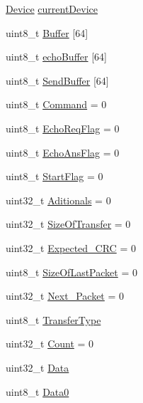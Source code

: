 \begin{DoxyCompactItemize}
\hyperlink{struct_device}{\-Device} \hyperlink{group___copter_control_b_l_ga6a2dbcb4687334b324d72b9824174903}{current\-Device}
\item 
uint8\-\_\-t \hyperlink{group___copter_control_b_l_ga4087ff5eba1dd1ed72c881f9c6ecc662}{\-Buffer} \mbox{[}64\mbox{]}
\item 
uint8\-\_\-t \hyperlink{group___copter_control_b_l_ga7dd4853474086e75f278ea07c2f0b506}{echo\-Buffer} \mbox{[}64\mbox{]}
\item 
uint8\-\_\-t \hyperlink{group___copter_control_b_l_ga8f7836468d53f1bf54ab28474ae14624}{\-Send\-Buffer} \mbox{[}64\mbox{]}
\item 
uint8\-\_\-t \hyperlink{group___copter_control_b_l_ga5d77325144370536cfb1275bb9812dd8}{\-Command} = 0
\item 
uint8\-\_\-t \hyperlink{group___copter_control_b_l_gaeda788a6eac8e2e01a62eb1f62627c8e}{\-Echo\-Req\-Flag} = 0
\item 
uint8\-\_\-t \hyperlink{group___copter_control_b_l_ga80f6f95b1bc0667183dbf26b5439a289}{\-Echo\-Ans\-Flag} = 0
\item 
uint8\-\_\-t \hyperlink{group___copter_control_b_l_ga9714ca7021be994d98814d72d24e0e4b}{\-Start\-Flag} = 0
\item 
uint32\-\_\-t \hyperlink{group___copter_control_b_l_ga55ee7360660cad039fba9c5d63e62ec9}{\-Aditionals} = 0
\item 
uint32\-\_\-t \hyperlink{group___copter_control_b_l_gaae39e28f51232563c8050780727ff60f}{\-Size\-Of\-Transfer} = 0
\item 
uint32\-\_\-t \hyperlink{group___copter_control_b_l_ga94f31f25ef279f9c71f72fc084e684dc}{\-Expected\-\_\-\-C\-R\-C} = 0
\item 
uint8\-\_\-t \hyperlink{group___copter_control_b_l_gae5cdea66e4be461e9e6ad70a4b3b6328}{\-Size\-Of\-Last\-Packet} = 0
\item 
uint32\-\_\-t \hyperlink{group___copter_control_b_l_ga648c8e3066059c1bc314367bcae79b2f}{\-Next\-\_\-\-Packet} = 0
\item 
uint8\-\_\-t \hyperlink{group___copter_control_b_l_ga116631edad477e1dae1a1df22398c06e}{\-Transfer\-Type}
\item 
uint32\-\_\-t \hyperlink{group___copter_control_b_l_gad3fa7da84ce75c8b58d9251838377e8f}{\-Count} = 0
\item 
uint32\-\_\-t \hyperlink{group___copter_control_b_l_ga6f3335509cc4943e20df66f72483910c}{\-Data}
\item 
uint8\-\_\-t \hyperlink{group___copter_control_b_l_ga94fd0caceb036a8631e3e09ebcb79793}{\-Data0}

\end{DoxyCompactItemize}
